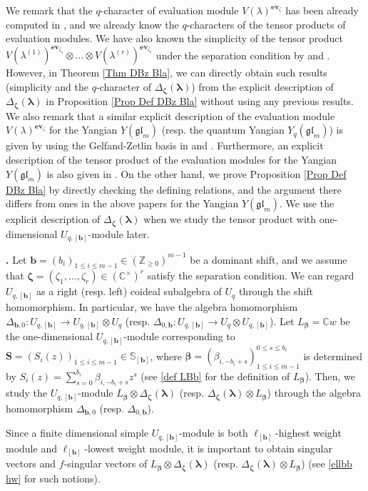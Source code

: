 \documentclass[12pt]{amsart}
\def \para{\refstepcounter{thm} \par\medskip\noindent
                \textbf{\thethm .} }
\numberwithin{equation}{thm}
\newcommand\CC{\mathbb C}
\renewcommand\SS{\mathbb S} %
\newcommand\ZZ{\mathbb Z}
\newcommand\bS{\mathbf S}
\newcommand\bb{\mathbf b}
\renewcommand\b{\beta}   %
\newcommand\z{\zeta}
\newcommand\la{\lambda}
\newcommand\D{\Delta}
\newcommand\Bb{\boldsymbol\beta}
\newcommand\Bz{\boldsymbol\zeta}
\newcommand\Bla{\boldsymbol\lambda}
\newcommand\ra{\rightarrow}
\newcommand\Fgl{\mathfrak{gl}}
\newcommand\ev{\mathbf{{ev}}}
\newcounter{ni}
\begin{document}
We remark that the $q$-character of evaluation module $V(\la)^{\ev_\z}$ 
has been already computed in \cite{FM02}, 
and we already know the $q$-characters of the tensor products of evaluation modules. 
We have also known the simplicity of the tensor product $V(\la^{(1)})^{\ev_{\z_1}} \otimes \dots \otimes V(\la^{(r)})^{\ev_{\z_r}}$ 
under the separation condition 
by \cite{MTZ04} and \cite{Her10}. 
However, in Theorem \ref{Thm DBz Bla}, 
we can directly obtain such results (simplicity and the $q$-character of $\D_{\Bz} (\Bla)$) 
from the explicit description of $\D_{\Bz} (\Bla)$ in  Proposition \ref{Prop Def DBz Bla} 
without using any previous results. 
We also remark that a similar explicit description of the evaluation module $V(\la)^{\ev_\z}$ 
for the Yangian $Y(\Fgl_m)$ (resp. the quantum Yangian $Y_q (\Fgl_m)$) is given by using the Gelfand-Zetlin basis 
in \cite{Mol94} and \cite{NT94}.  
Furthermore, an explicit description of the tensor product of the evaluation modules for the Yangian $Y(\Fgl_m)$ is also given 
in \cite{NT98}. 
On the other hand, we prove Proposition \ref{Prop Def DBz Bla} by directly checking the defining relations, 
and the argument there differs from ones in the above papers for the Yangian $Y(\Fgl_m)$.  
We use the explicit description of $\D_{\Bz} (\Bla)$ 
when we study the tensor product with one-dimensional $U_{q,[\bb]}$-module later. 　

\para 
Let $\bb =(b_i)_{1 \leq i \leq m-1} \in (\ZZ_{\geq 0})^{m-1}$ be a dominant shift, 
and we assume that $\Bz=(\z_1,\dots, \z_r) \in (\CC^{\times})^r$ satisfy the separation condition. 
We can regard $U_{q,[\bb]}$ as a right (resp. left) coideal subalgebra of $U_q$ through the shift homomorphism. 
In particular, we have the algebra homomorphism $\D_{\bb,0} : U_{q,[\bb]} \ra U_{q,[\bb]} \otimes U_q$ 
(resp. $\D_{0, \bb} : U_{q,[\bb]} \ra U_q \otimes U_{q,[\bb]}$).  
Let $L_{\Bb} = \CC w$ be the  one-dimensional $U_{q,[\bb]}$-module 
corresponding to $\bS =(S_i(z))_{1 \leq i \leq m-1} \in \SS_{[\bb]}$,  
where $\Bb= (\b_{i, - b_i+s})_{1 \leq i \leq m-1}^{0 \leq s \leq b_i}$ is determined by 
$S_i(z) = \sum_{s=0}^{b_i} \b_{i, - b_i+s} z^s$ 
(see \eqref{def LBb} for the definition of $L_{\Bb}$). 
Then, we study the $U_{q,[\bb]}$-module 
$L_{\Bb} \otimes \D_{\Bz} (\Bla)$ (resp. $\D_{\Bz}(\Bla) \otimes L_{\Bb}$) 
through the algebra homomorphism $\D_{\bb,0}$ (resp. $\D_{0, \bb}$). 

Since a finite dimensional simple $U_{q,[\bb]}$-module is both $\ell_{[\bb]}$-highest weight module and $\ell_{[\bb]}$-lowest weight module, 
it is important to obtain singular vectors and $f$-singular vectors of 
$L_{\Bb} \otimes \D_{\Bz} (\Bla)$ (resp. $\D_{\Bz}(\Bla) \otimes L_{\Bb}$) 
(see \ref{ellbb hw} for such notions). 
\end{document}
